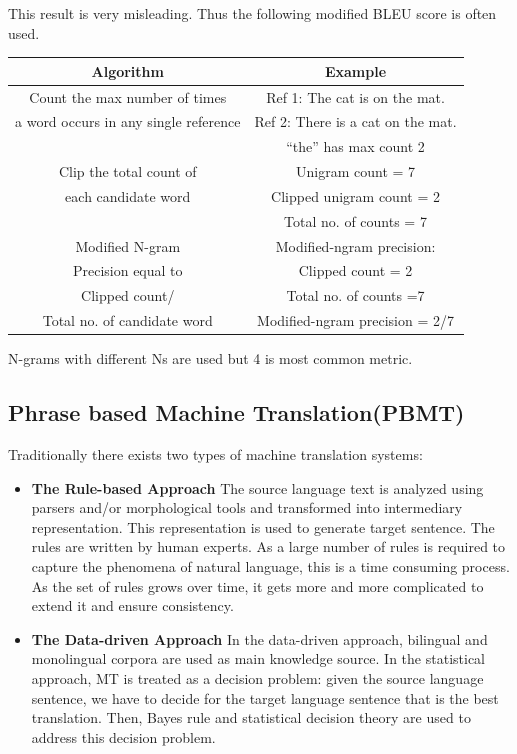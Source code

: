 \documentclass[conference]{IEEEtran}
\begin{document}
This result is very misleading. Thus the following modified BLEU score is often used.
 \begin{table}[h]
    \centering
    \begin{tabular}{|c|c|}
        \hline
        \textbf{Algorithm}  & \textbf{Example}  \\ \hline
        Count the max number of times       &       Ref 1: The cat is on the mat.  \\
        a word occurs in any single reference &   Ref 2: There is a cat on the mat. \\
        &“the” has max count 2         \\ 
 \hline
	Clip the total count of & Unigram count = 7 \\
	each candidate word & Clipped unigram count = 2 \\
	&Total no. of counts = 7 \\
\hline
	Modified N-gram & Modified-ngram precision: \\
	Precision equal to & Clipped count = 2 \\
	Clipped count/ & Total no. of counts =7\\
	Total no. of candidate word & Modified-ngram precision = 2/7\\
\hline	
    \end{tabular}
    \end{table}
N-grams with different Ns are used but 4 is most common metric.

\subsection{Phrase based Machine Translation(PBMT)}

Traditionally there exists two types of machine translation systems:
\begin{itemize}
 \item \textbf{The Rule-based Approach}
The source language text is analyzed using parsers and/or
morphological tools and transformed into intermediary representation. This
representation is used to generate target sentence. The rules are written by
human experts. As a large number of rules is required to capture the phenomena of
natural language, this is a time consuming process. As the set of rules grows over
time, it gets more and more complicated to extend it and ensure consistency.
\item \textbf{The Data-driven Approach}
In the data-driven approach, bilingual and monolingual corpora are used as main
knowledge source. In the statistical approach, MT is treated as a decision problem: given
the source language sentence, we have to decide for the target language sentence
that is the best translation. Then, Bayes rule and statistical decision theory are
used to address this decision problem.
\end{itemize}
\end{document}
